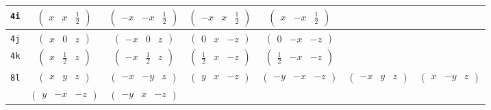 \documentclass[fleqn,9pt,landscape]{jsarticle}
\begin{document}
\begin{center}
\begin{longtable}{ccccccc}
{\tt 4i} & $ \begin{pmatrix} x & x & \frac{1}{2} \end{pmatrix} $ & $ \begin{pmatrix} - x & - x & \frac{1}{2} \end{pmatrix} $ & $ \begin{pmatrix} - x & x & \frac{1}{2} \end{pmatrix} $ & $ \begin{pmatrix} x & - x & \frac{1}{2} \end{pmatrix} $ & $  $ & $  $ \\ \hline
{\tt 4j} & $ \begin{pmatrix} x & 0 & z \end{pmatrix} $ & $ \begin{pmatrix} - x & 0 & z \end{pmatrix} $ & $ \begin{pmatrix} 0 & x & - z \end{pmatrix} $ & $ \begin{pmatrix} 0 & - x & - z \end{pmatrix} $ & $  $ & $  $ \\ \hline
{\tt 4k} & $ \begin{pmatrix} x & \frac{1}{2} & z \end{pmatrix} $ & $ \begin{pmatrix} - x & \frac{1}{2} & z \end{pmatrix} $ & $ \begin{pmatrix} \frac{1}{2} & x & - z \end{pmatrix} $ & $ \begin{pmatrix} \frac{1}{2} & - x & - z \end{pmatrix} $ & $  $ & $  $ \\ \hline
{\tt 8l} & $ \begin{pmatrix} x & y & z \end{pmatrix} $ & $ \begin{pmatrix} - x & - y & z \end{pmatrix} $ & $ \begin{pmatrix} y & x & - z \end{pmatrix} $ & $ \begin{pmatrix} - y & - x & - z \end{pmatrix} $ & $ \begin{pmatrix} - x & y & z \end{pmatrix} $ & $ \begin{pmatrix} x & - y & z \end{pmatrix} $ \\
& $ \begin{pmatrix} y & - x & - z \end{pmatrix} $ & $ \begin{pmatrix} - y & x & - z \end{pmatrix} $ & $  $ & $  $ & $  $ & $  $ \\
\end{longtable}
\end{center}
\end{document}
